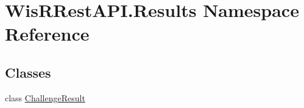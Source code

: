 \hypertarget{namespace_wis_r_rest_a_p_i_1_1_results}{}\section{Wis\+R\+Rest\+A\+P\+I.\+Results Namespace Reference}
\label{namespace_wis_r_rest_a_p_i_1_1_results}
\subsection*{Classes}
\begin{DoxyCompactItemize}
\item 
class \hyperlink{class_wis_r_rest_a_p_i_1_1_results_1_1_challenge_result}{Challenge\+Result}
\end{DoxyCompactItemize}
